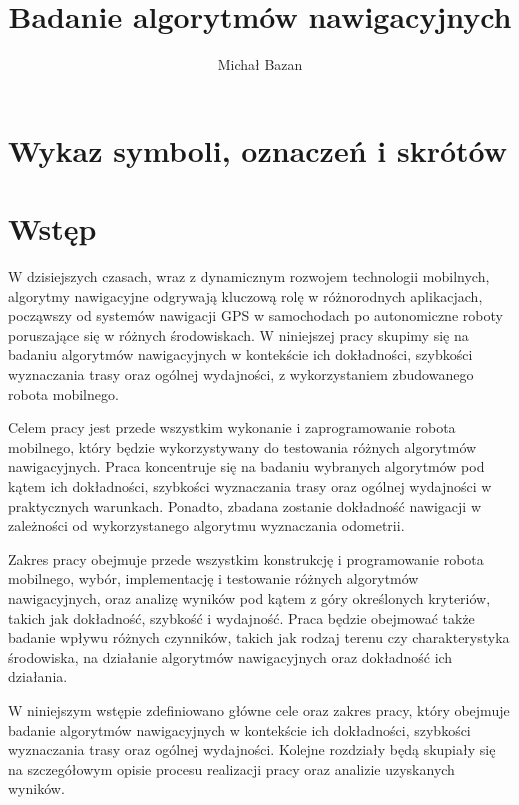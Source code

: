 \documentclass[12pt,twoside]{article}
\author{Michał Bazan}
\title{Badanie algorytmów nawigacyjnych}
\begin{document}
\maketitle

\blankpage

\tableofcontents

\clearpage
\blankpage


\section*{Wykaz symboli, oznaczeń i skrótów}


\section{Wstęp}
W dzisiejszych czasach, wraz z dynamicznym rozwojem technologii mobilnych, algorytmy nawigacyjne odgrywają kluczową rolę w różnorodnych aplikacjach, począwszy od systemów nawigacji GPS w samochodach po autonomiczne roboty poruszające się w różnych środowiskach. W niniejszej pracy skupimy się na badaniu algorytmów nawigacyjnych w kontekście ich dokładności, szybkości wyznaczania trasy oraz ogólnej wydajności, z wykorzystaniem zbudowanego robota mobilnego.

Celem pracy jest przede wszystkim wykonanie i zaprogramowanie robota mobilnego, który będzie wykorzystywany do testowania różnych algorytmów nawigacyjnych. Praca koncentruje się na badaniu wybranych algorytmów pod kątem ich dokładności, szybkości wyznaczania trasy oraz ogólnej wydajności w praktycznych warunkach. Ponadto, zbadana zostanie dokładność nawigacji w zależności od wykorzystanego algorytmu wyznaczania odometrii.

Zakres pracy obejmuje przede wszystkim konstrukcję i programowanie robota mobilnego, wybór, implementację i testowanie różnych algorytmów nawigacyjnych, oraz analizę wyników pod kątem z góry określonych kryteriów, takich jak dokładność, szybkość i wydajność. Praca będzie obejmować także badanie wpływu różnych czynników, takich jak rodzaj terenu czy charakterystyka środowiska, na działanie algorytmów nawigacyjnych oraz dokładność ich działania.

W niniejszym wstępie zdefiniowano główne cele oraz zakres pracy, który obejmuje badanie algorytmów nawigacyjnych w kontekście ich dokładności, szybkości wyznaczania trasy oraz ogólnej wydajności. Kolejne rozdziały będą skupiały się na szczegółowym opisie procesu realizacji pracy oraz analizie uzyskanych wyników.
\end{document}
